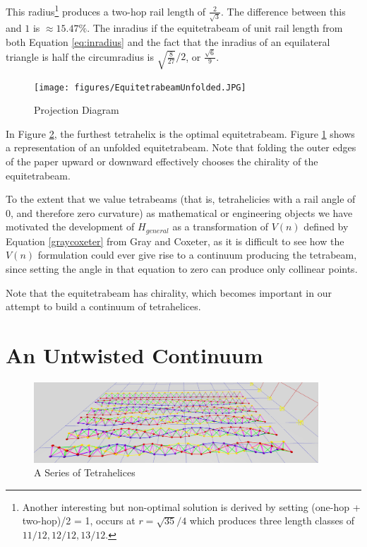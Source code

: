 \documentclass[11pt]{article}
\begin{document}
This radius\footnote{Another interesting but non-optimal solution is derived by setting
  (one-hop + two-hop)/2 = 1,
  occurs at $r = \sqrt{35}/4$ which produces
  three length classes of $11/12, 12/12, 13/12$.}
produces a two-hop rail length of $\frac{2}{\sqrt{3}}$.
The difference between this and $1$ is $\approx 15.47\% $. The inradius if the equitetrabeam of unit
rail length from both Equation \eqref{eq:inradius} and the fact that the inradius of
an equilateral triangle is half the circumradius is $\sqrt{\frac{8}{27}}/2$, or $\frac{\sqrt{6}}{9}$.




\begin{figure}[H]
  \label{fig:unfolded}
     \centering
     \texttt{[image: figures/EquitetrabeamUnfolded.JPG]}
     \caption{Projection Diagram}
\end{figure}

In Figure \ref{fig:spudboy}, the furthest tetrahelix is the optimal equitetrabeam.
Figure \ref{fig:unfolded} shows a representation of an unfolded equitetrabeam.
Note that folding the outer edges of the paper upward or downward effectively
chooses the chirality of the equitetrabeam.

To the extent that we value tetrabeams (that is, tetrahelicies with a rail angle of $0$,
and therefore zero curvature) as mathematical or engineering objects
we have motivated the development of $H_{general}$ as a transformation of $V(n)$ defined by
Equation \eqref{graycoxeter} from Gray and Coxeter, as it is difficult to see how
the $V(n)$ 
formulation could ever give rise to a continuum producing the tetrabeam,
since setting the angle in that equation to zero can produce only collinear points.

Note that the equitetrabeam has chirality, which becomes important in our attempt to build a
continuum of tetrahelices.

\section{An Untwisted Continuum}

\begin{figure}[H]
  \label{fig:spudboy}
  \centering
     \includegraphics[width=0.95\textwidth]{figures/TetrahelixSeries.png}
     \caption{A Series of Tetrahelices}
\end{figure}
\end{document}
